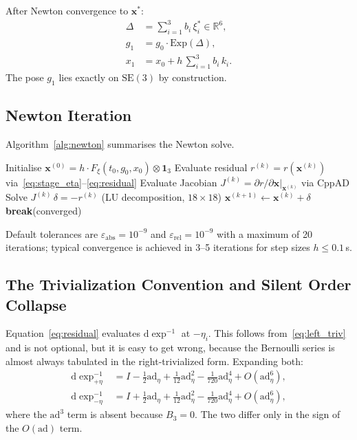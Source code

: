 \documentclass[a4paper,10pt]{article}
\newcommand{\SE}{\mathrm{SE}(3)}
\newcommand{\Exp}{\mathrm{Exp}}
\newcommand{\dexp}{\mathrm{d}\exp}
\newcommand{\ad}{\mathrm{ad}}
\newcommand{\R}{\mathbb{R}}
\newcommand{\norm}[1]{\left\lVert #1 \right\rVert}
\theoremstyle{definition}
\begin{document}
After Newton convergence to $\mathbf{x}^*$:
\begin{align}
  \Delta &= \textstyle\sum_{i=1}^{3} b_i\,\xi_i^* \in \R^6,\\
  g_1    &= g_0 \cdot \Exp(\Delta),\\
  x_1    &= x_0 + h\,\textstyle\sum_{i=1}^{3} b_i\,k_i.
\end{align}
The pose $g_1$ lies exactly on $\SE$ by construction.

\subsection{Newton Iteration}

Algorithm~\ref{alg:newton} summarises the Newton solve.

\begin{algorithm}[h]
\caption{Newton iteration for the RKMK stage system}
\label{alg:newton}
\begin{algorithmic}[1]
  \State Initialise $\mathbf{x}^{(0)} = h \cdot F_\xi(t_0, g_0, x_0) \otimes \mathbf{1}_3$
    \State Evaluate residual $r^{(k)} = r(\mathbf{x}^{(k)})$ via~\eqref{eq:stage_eta}--\eqref{eq:residual}
    \State Evaluate Jacobian $J^{(k)} = \partial r / \partial \mathbf{x}\big|_{\mathbf{x}^{(k)}}$ via CppAD
    \State Solve $J^{(k)}\,\delta = -r^{(k)}$ (LU decomposition, $18\times18$)
    \State $\mathbf{x}^{(k+1)} \leftarrow \mathbf{x}^{(k)} + \delta$
    \If{$\norm{r^{(k+1)}} < \varepsilon_{\mathrm{abs}} + \varepsilon_{\mathrm{rel}}\norm{r^{(0)}}$}
      \State \textbf{break}\quad(converged)
    \EndIf
  \EndFor
\end{algorithmic}
\end{algorithm}

Default tolerances are $\varepsilon_{\mathrm{abs}} = 10^{-9}$ and
$\varepsilon_{\mathrm{rel}} = 10^{-9}$ with a maximum of 20 iterations;
typical convergence is achieved in 3--5 iterations for step sizes $h \leq
0.1\,$s.

\subsection{The Trivialization Convention and Silent Order Collapse}
\label{sec:trivialization}

Equation~\eqref{eq:residual} evaluates $\dexp^{-1}$ at $-\eta_i$.  This
follows from~\eqref{eq:left_triv} and is not optional, but it is easy to get
wrong, because the Bernoulli series is almost always tabulated in the
right-trivialized form.  Expanding both:
\begin{align}
  \dexp^{-1}_{+\eta} &= I - \tfrac{1}{2}\ad_\eta + \tfrac{1}{12}\ad^2_\eta
    - \tfrac{1}{720}\ad^4_\eta + O(\ad^6_\eta),
    \label{eq:dexpinv_right}\\
  \dexp^{-1}_{-\eta} &= I + \tfrac{1}{2}\ad_\eta + \tfrac{1}{12}\ad^2_\eta
    - \tfrac{1}{720}\ad^4_\eta + O(\ad^6_\eta),
    \label{eq:dexpinv_left}
\end{align}
where the $\ad^3$ term is absent because $B_3 = 0$.  The two differ only in
the sign of the $O(\ad)$ term.
\end{document}
